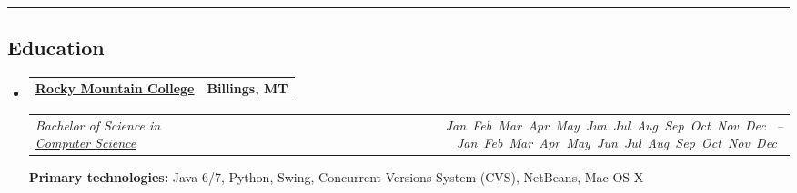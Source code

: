 \documentclass[9pt,letterpaper]{extarticle}
\makeatletter
\newcommand{\headerrow}[2]
{\begin{tabular*}{\linewidth}{l@{\extracolsep{\fill}}r}
	#1 &
	#2 \\
\end{tabular*}}
\newcommand{\DatestampYM}[2]{\mbox{\ShortMonth{#2} #1}}
\newcommand{\ShortMonth}[1]{%
\ifcase#1\relax
\or Jan%
\or Feb%
\or Mar%
\or Apr%
\or May%
\or Jun%
\or Jul%
\or Aug%
\or Sep%
\or Oct%
\or Nov%
\or Dec%
\fi}
\makeatother
\begin{document}
\hrule
\vspace{-0.2em}
\subsection*{Education}

\begin{itemize}
	\parskip=0.1em

	\item
	\headerrow
		{\textbf{\href{http://www.rocky.edu/}{Rocky Mountain College}}}
		{\textbf{Billings, MT}}
	\headerrow
		{\emph{Bachelor of Science in \href{http://cs.rocky.edu/}{Computer Science}}}
		{\emph{\DatestampYM{2010}{08} -- \DatestampYM{2014}{05}}}
	\textbf{Primary technologies:} Java 6/7, Python, Swing, Concurrent Versions System (CVS), NetBeans, Mac OS X
\end{itemize}
\end{document}
